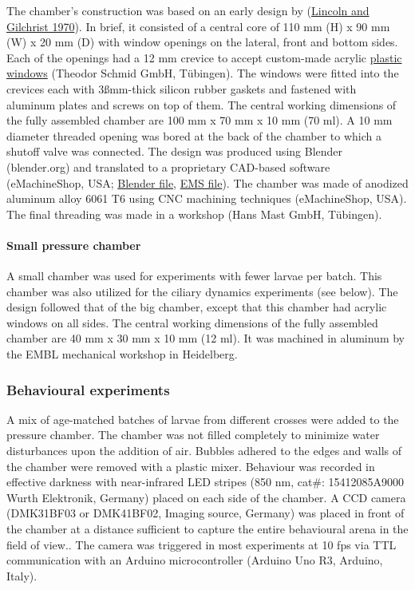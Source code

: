 \documentclass[
]{article}
\begin{document}
The chamber's construction was based on an early design by
(\protect\hyperlink{ref-lincoln_1970}{Lincoln and Gilchrist 1970}). In
brief, it consisted of a central core of 110 mm (H) x 90 mm (W) x 20 mm
(D) with window openings on the lateral, front and bottom sides. Each of
the openings had a 12 mm crevice to accept custom-made acrylic
\href{https://github.com/JekelyLab/Bezares_et_al_2023_Pressure/blob/main/Data/Mechanical_drawings/Zeichnung_Fenster_Bezares2.pdf}{plastic
windows} (Theodor Schmid GmbH, Tübingen). The windows were fitted into
the crevices each with 3ßmm-thick silicon rubber gaskets and fastened
with aluminum plates and screws on top of them. The central working
dimensions of the fully assembled chamber are 100 mm x 70 mm x 10 mm (70
ml). A 10 mm diameter threaded opening was bored at the back of the
chamber to which a shutoff valve was connected. The design was produced
using Blender (blender.org) and translated to a proprietary CAD-based
software (eMachineShop, USA;
\href{https://github.com/JekelyLab/Bezares_et_al_2023_Pressure/blob/main/Data/Mechanical_drawings/Aluminium_Chamber.blend}{Blender
file},
\href{https://github.com/JekelyLab/Bezares_et_al_2023_Pressure/blob/main/Data/Mechanical_drawings/Aluminium_Chamber.ems}{EMS
file}). The chamber was made of anodized aluminum alloy 6061 T6 using
CNC machining techniques (eMachineShop, USA). The final threading was
made in a workshop (Hans Mast GmbH, Tübingen).

\hypertarget{small-pressure-chamber}{%
\paragraph{Small pressure chamber}\label{small-pressure-chamber}}

A small chamber was used for experiments with fewer larvae per batch.
This chamber was also utilized for the ciliary dynamics experiments (see
below). The design followed that of the big chamber, except that this
chamber had acrylic windows on all sides. The central working dimensions
of the fully assembled chamber are 40 mm x 30 mm x 10 mm (12 ml). It was
machined in aluminum by the EMBL mechanical workshop in Heidelberg.

\hypertarget{behavioural-experiments}{%
\subsubsection{Behavioural experiments}\label{behavioural-experiments}}

A mix of age-matched batches of larvae from different crosses were added
to the pressure chamber. The chamber was not filled completely to
minimize water disturbances upon the addition of air. Bubbles adhered to
the edges and walls of the chamber were removed with a plastic mixer.
Behaviour was recorded in effective darkness with near-infrared LED
stripes (850 nm, cat\#: 15412085A9000 Wurth Elektronik, Germany) placed
on each side of the chamber. A CCD camera (DMK31BF03 or DMK41BF02,
Imaging source, Germany) was placed in front of the chamber at a
distance sufficient to capture the entire behavioural arena in the field
of view.. The camera was triggered in most experiments at 10 fps via TTL
communication with an Arduino microcontroller (Arduino Uno R3, Arduino,
Italy).
\end{document}
